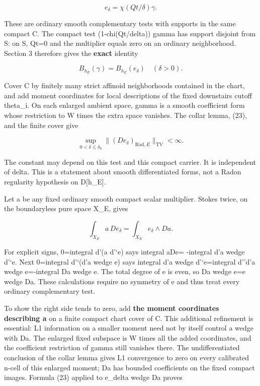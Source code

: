 \documentclass[
  10pt,
]{article}
\begin{document}
\[
 e_\delta=\chi(Qt/\delta)\gamma.                            \tag{24}
\]

These are ordinary smooth complementary tests with supports in the same
compact C. The compact test (1-chi(Qt/delta)) gamma has support disjoint
from S: on S, Qt=0 and the multiplier equals zero on an ordinary
neighborhood. Section 3 therefore gives the \textbf{exact} identity

\[
 B_{h_E}(\gamma)=B_{h_E}(e_\delta)\quad(\delta>0).             \tag{25}
\]

Cover C by finitely many strict affinoid neighborhoods contained in the
chart, and add moment coordinates for local descriptions of the fixed
downstairs cutoff theta\_i. On each enlarged ambient space, gamma is a
smooth coefficient form whose restriction to W times the extra space
vanishes. The collar lemma, (23), and the finite cover give

\[
 \sup_{0<\delta\leq\delta_0}
       \|(D e_\delta)_{\mathrm{Rad},E}\|_{\mathrm{TV}}<\infty. \tag{26}
\]

The constant may depend on this test and this compact carrier. It is
independent of delta. This is a statement about smooth differentiated
forms, not a Radon regularity hypothesis on D{[}h\_E{]}.

Let a be any fixed ordinary smooth compact scalar multiplier. Stokes
twice, on the boundaryless pure space X\_E, gives

\[
 \int_{X_E}a\,D e_\delta=\int_{X_E}e_\delta\wedge D a.        \tag{27}
\]

For explicit signs, 0=integral d'(a d'`e) says integral aDe= -integral
d'a wedge d'`e. Next 0=integral d'`(d'a wedge e) says integral d'a wedge
d'`e=integral d''d'a wedge e=-integral Da wedge e. The total degree of e
is even, so Da wedge e=e wedge Da. These calculations require no
symmetry of e and thus treat every ordinary complementary test.

To show the right side tends to zero, add \textbf{the moment coordinates
describing a} on a finite compact chart cover of C. This additional
refinement is essential: L1 information on a smaller moment need not by
itself control a wedge with Da. The enlarged fixed subspace is W times
all the added coordinates, and the coefficient restriction of gamma
still vanishes there. The undifferentiated conclusion of the collar
lemma gives L1 convergence to zero on every calibrated n-cell of this
enlarged moment; Da has bounded coefficients on the fixed compact
images. Formula (23) applied to e\_delta wedge Da proves
\end{document}
